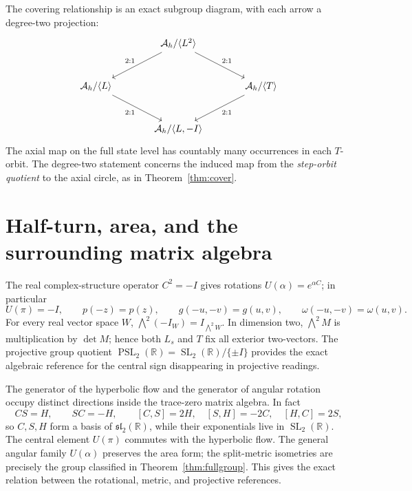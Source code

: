 \documentclass[10pt,letterpaper]{article}
\theoremstyle{definition}\newtheorem{definition}[theorem]{Definition}
\newcommand{\RR}{\mathbb R}
\newcommand{\Id}{I}
\newcommand{\SL}{\operatorname{SL}}
\newcommand{\PSL}{\operatorname{PSL}}
\newcommand{\Ah}{\mathcal A_h}
\begin{document}
The covering relationship is an exact subgroup diagram, with each arrow a degree-two projection:
\begin{equation}\label{eq:diamondpicture}
\begin{tikzcd}[row sep=large,column sep=large]
& \Ah/\langle L^2\rangle \arrow[dl, "2{:}1"'] \arrow[dr,"2{:}1"] & \\
\Ah/\langle L\rangle \arrow[dr,"2{:}1"'] & & \Ah/\langle T\rangle \arrow[dl,"2{:}1"] \\
& \Ah/\langle L,-\Id\rangle &
\end{tikzcd}
\end{equation}
The axial map on the full state level has countably many occurrences in each $T$-orbit. The degree-two statement concerns the induced map from the \emph{step-orbit quotient} to the axial circle, as in Theorem~\ref{thm:cover}.

\section{Half-turn, area, and the surrounding matrix algebra}
The real complex-structure operator $C^2=-\Id$ gives rotations $U(\alpha)=e^{\alpha C}$; in particular
\begin{equation}\label{eq:half}
 U(\pi)=-\Id,\qquad
 p(-z)=p(z),\qquad
 g(-u,-v)=g(u,v),\qquad \omega(-u,-v)=\omega(u,v).
\end{equation}
For every real vector space $W$, $\bigwedge^2(-\Id_W)=\Id_{\bigwedge^2W}$. In dimension two, $\bigwedge^2 M$ is multiplication by $\det M$; hence both $L_s$ and $T$ fix all exterior two-vectors. The projective group quotient $\PSL_2(\RR)=\SL_2(\RR)/\{\pm\Id\}$ provides the exact algebraic reference for the central sign disappearing in projective readings.

The generator of the hyperbolic flow and the generator of angular rotation occupy distinct directions inside the trace-zero matrix algebra. In fact
\begin{equation}\label{eq:lie}
 CS=H,\qquad SC=-H,\qquad
 [C,S]=2H,\quad [S,H]=-2C,\quad [H,C]=2S,
\end{equation}
so $C,S,H$ form a basis of $\mathfrak{sl}_2(\RR)$, while their exponentials live in $\SL_2(\RR)$. The central element $U(\pi)$ commutes with the hyperbolic flow. The general angular family $U(\alpha)$ preserves the area form; the split-metric isometries are precisely the group classified in Theorem~\ref{thm:fullgroup}. This gives the exact relation between the rotational, metric, and projective references.
\end{document}
